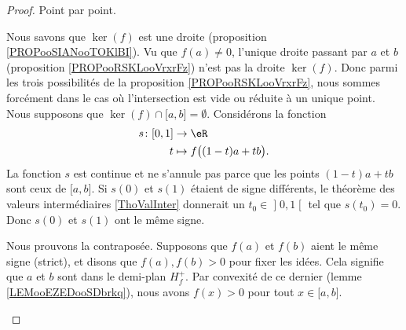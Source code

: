 \begin{proof} 
    Point par point.
    \begin{subproof}
        Nous savons que \( \ker(f)\) est une droite (proposition \ref{PROPooSIANooTOKlBI}). Vu que \( f(a)\neq 0\), l'unique droite passant par \( a\) et \( b\) (proposition \ref{PROPooRSKLooVrxrFz}) n'est pas la droite \( \ker(f)\). Donc parmi les trois possibilités de la proposition \ref{PROPooRSKLooVrxrFz}, nous sommes forcément dans le cas où l'intersection est vide ou réduite à un unique point.
        Nous supposons que \( \ker(f)\cap\mathopen[ a , b \mathclose]=\emptyset\). Considérons la fonction
        \begin{equation}
            \begin{aligned}
                s\colon \mathopen[ 0 , 1 \mathclose]&\to \eR \\
                t&\mapsto f\big( (1-t)a+tb \big). 
            \end{aligned}
        \end{equation}
        La fonction \( s\) est continue et ne s'annule pas parce que les points \( (1-t)a+tb\) sont ceux de \( \mathopen[ a , b \mathclose]\). Si \( s(0)\) et \( s(1)\) étaient de signe différents, le théorème des valeurs intermédiaires \ref{ThoValInter} donnerait un \( t_0\in\mathopen] 0 , 1 \mathclose[\) tel que \( s(t_0)=0\). Donc \( s(0)\) et \( s(1)\) ont le même signe.

        Nous prouvons la contraposée. Supposons que \( f(a)\) et \( f(b)\) aient le même signe (strict), et disons que \( f(a), f(b)>0\) pour fixer les idées. Cela signifie que \( a\) et \( b\) sont dans le demi-plan \( H_f^+\). Par convexité de ce dernier (lemme \ref{LEMooEZEDooSDbrkq}), nous avons \( f(x)>0\) pour tout \( x\in\mathopen[ a , b \mathclose]\).

    \end{subproof}
\end{proof}

